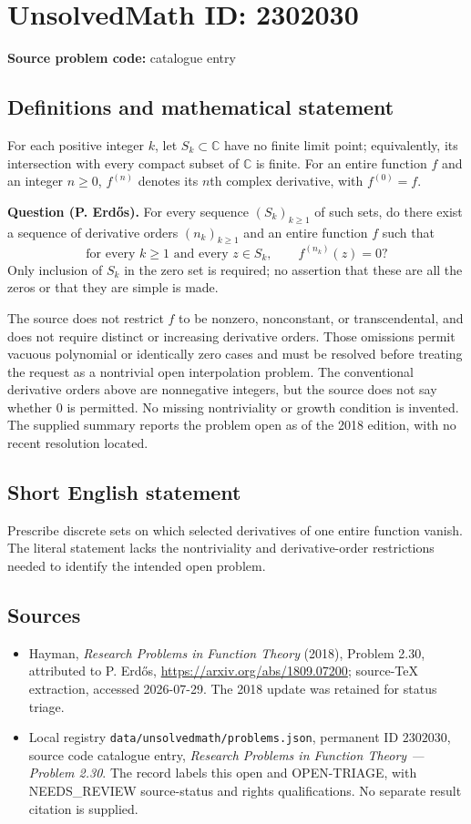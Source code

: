 \documentclass[11pt]{article}
\begin{document}
\section*{UnsolvedMath ID: 2302030}
\textbf{Source problem code:} catalogue entry
\subsection{Definitions and mathematical statement}
For each positive integer $k$, let $S_k\subset\mathbb C$ have no finite limit point; equivalently, its intersection with every compact subset of $\mathbb C$ is finite. For an entire function $f$ and an integer $n\geq0$, $f^{(n)}$ denotes its $n$th complex derivative, with $f^{(0)}=f$.

\textbf{Question (P. Erd\H{o}s).} For every sequence $(S_k)_{k\geq1}$ of such sets, do there exist a sequence of derivative orders $(n_k)_{k\geq1}$ and an entire function $f$ such that
\[
\text{for every }k\geq1\text{ and every }z\in S_k,
\qquad f^{(n_k)}(z)=0?
\]
Only inclusion of $S_k$ in the zero set is required; no assertion that these are all the zeros or that they are simple is made.

The source does not restrict $f$ to be nonzero, nonconstant, or transcendental, and does not require distinct or increasing derivative orders. Those omissions permit vacuous polynomial or identically zero cases and must be resolved before treating the request as a nontrivial open interpolation problem. The conventional derivative orders above are nonnegative integers, but the source does not say whether $0$ is permitted. No missing nontriviality or growth condition is invented. The supplied summary reports the problem open as of the 2018 edition, with no recent resolution located.
\subsection{Short English statement}
Prescribe discrete sets on which selected derivatives of one entire function vanish. The literal statement lacks the nontriviality and derivative-order restrictions needed to identify the intended open problem.
\subsection{Sources}
\begin{itemize}
\item Hayman, \emph{Research Problems in Function Theory} (2018), Problem 2.30, attributed to P. Erd\H{o}s, \url{https://arxiv.org/abs/1809.07200}; source-TeX extraction, accessed 2026-07-29. The 2018 update was retained for status triage.
\item Local registry \texttt{data/unsolvedmath/problems.json}, permanent ID $2302030$, source code catalogue entry, \emph{Research Problems in Function Theory --- Problem 2.30}. The record labels this open and OPEN-TRIAGE, with NEEDS\_REVIEW source-status and rights qualifications. No separate result citation is supplied.
\end{itemize}
\end{document}
